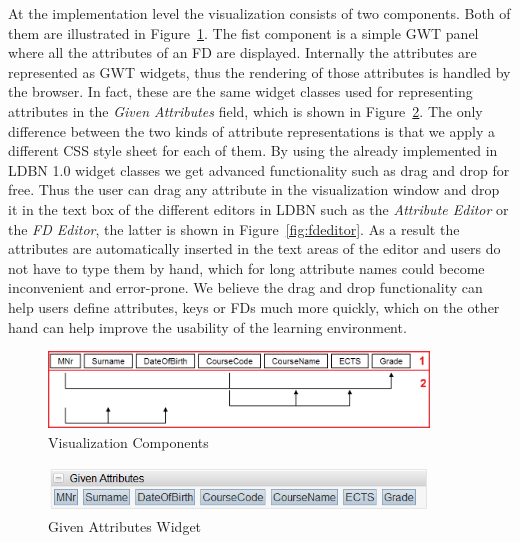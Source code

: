At the implementation level the visualization consists of two components. 
Both of them are illustrated in Figure~\ref{fig:impl-fds01}.
The fist component is a simple GWT panel where all the attributes of an FD are displayed. 
Internally the attributes are represented as GWT widgets, thus the rendering of those attributes is
handled by the browser. In fact, these are the same widget classes used for representing
attributes in the \emph{Given Attributes} field, which is shown in Figure~\ref{fig:given-atts}. 
The only difference between the two kinds of attribute representations is 
that we apply a different CSS style sheet for each of them. By using the already implemented in LDBN 1.0 
widget classes we get advanced functionality such as drag and drop for free. Thus the user
can drag any attribute in the visualization window and drop 
it in the text box of the different editors in LDBN
such as the \emph{Attribute Editor} or the \emph{FD Editor}, the latter is 
shown in Figure~\ref{fig:fdeditor}. 
As a result the
attributes are automatically inserted in the text areas of the editor and users do not have
to type them by hand, which for long attribute names could become inconvenient and error-prone. 
We believe the drag and drop functionality can help
users define attributes, keys or FDs much more quickly, which on the other hand can
help improve the usability of the learning environment.

\begin{figure}[h]
	\begin{center}
		\includegraphics[width=0.9\textwidth]{./img/impl-fds01.png}
		\caption{Visualization Components}
		\label{fig:impl-fds01}
	\end{center}
\end{figure}

\begin{figure}[h]
	\begin{center}
		\includegraphics[width=0.9\textwidth]{./img/given-atts.png}
		\caption{Given Attributes Widget}
		\label{fig:given-atts}
	\end{center}
\end{figure}


